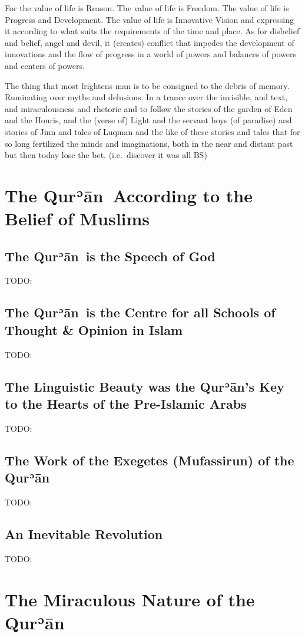 \documentclass[12pt]{memoir}
\def\´{ʾ} %
\def \Quran{Qur\-\´ān} %
\begin{document}
For the value of life is Reason. The value of life is Freedom. The value of
life is Progress and Development. The value of life is Innovative Vision and
expressing it according to what suits the requirements of the time and
place. As for disbelief and belief, angel and devil, it (creates) conflict that
impedes the development of innovations and the flow of progress in a world of
powers and balances of powers and centers of powers.

The thing that most frightens man is to be consigned to the debris of memory.
Ruminating over myths and delusions. In a trance over the invisible, and text,
and miraculousness and rhetoric and to follow the stories of the garden of Eden
and the Houris, and the (verse of) Light and the servant boys (of paradise) and
stories of Jinn and tales of Luqman and the like of these stories and tales
that for so long fertilized the minds and imaginations, both in the near and
distant past but then today lose the bet. (i.e.\ discover it was all BS)


\chapter{The \Quran\ According to the Belief of Muslims}

\section{The \Quran\ is the Speech of God}
TODO:
\section{The \Quran\ is the Centre for all
Schools of Thought \& Opinion in Islam}
TODO:
\section{The Linguistic Beauty was the \Quran’s Key
to the Hearts of the Pre-Islamic Arabs}
TODO:
\section[The Work of the Exegetes of the \Quran]
{The Work of the Exegetes (Mufassirun) of the \Quran}
TODO:
\section{An Inevitable Revolution}
TODO:

\chapter{The Miraculous Nature of the \Quran}
\end{document}
